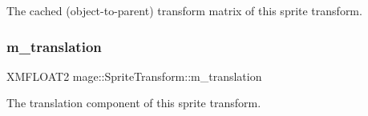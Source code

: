 The cached (object-\/to-\/parent) transform matrix of this sprite transform. \hypertarget{structmage_1_1_sprite_transform_a7642907ec8ae9685bb7c56675607045b}{}\label{structmage_1_1_sprite_transform_a7642907ec8ae9685bb7c56675607045b} 
\subsubsection{\texorpdfstring{m\+\_\+translation}{m\_translation}}
{\footnotesize\ttfamily X\+M\+F\+L\+O\+A\+T2 mage\+::\+Sprite\+Transform\+::m\+\_\+translation\hspace{0.3cm}{\ttfamily [private]}}

The translation component of this sprite transform. 